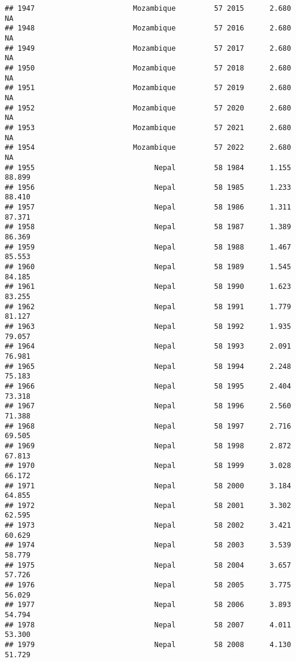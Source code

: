 \documentclass[
]{article}
\begin{document}
\begin{verbatim}
## 1947                       Mozambique         57 2015      2.680         NA
## 1948                       Mozambique         57 2016      2.680         NA
## 1949                       Mozambique         57 2017      2.680         NA
## 1950                       Mozambique         57 2018      2.680         NA
## 1951                       Mozambique         57 2019      2.680         NA
## 1952                       Mozambique         57 2020      2.680         NA
## 1953                       Mozambique         57 2021      2.680         NA
## 1954                       Mozambique         57 2022      2.680         NA
## 1955                            Nepal         58 1984      1.155     88.899
## 1956                            Nepal         58 1985      1.233     88.410
## 1957                            Nepal         58 1986      1.311     87.371
## 1958                            Nepal         58 1987      1.389     86.369
## 1959                            Nepal         58 1988      1.467     85.553
## 1960                            Nepal         58 1989      1.545     84.185
## 1961                            Nepal         58 1990      1.623     83.255
## 1962                            Nepal         58 1991      1.779     81.127
## 1963                            Nepal         58 1992      1.935     79.057
## 1964                            Nepal         58 1993      2.091     76.981
## 1965                            Nepal         58 1994      2.248     75.183
## 1966                            Nepal         58 1995      2.404     73.318
## 1967                            Nepal         58 1996      2.560     71.388
## 1968                            Nepal         58 1997      2.716     69.505
## 1969                            Nepal         58 1998      2.872     67.813
## 1970                            Nepal         58 1999      3.028     66.172
## 1971                            Nepal         58 2000      3.184     64.855
## 1972                            Nepal         58 2001      3.302     62.595
## 1973                            Nepal         58 2002      3.421     60.629
## 1974                            Nepal         58 2003      3.539     58.779
## 1975                            Nepal         58 2004      3.657     57.726
## 1976                            Nepal         58 2005      3.775     56.029
## 1977                            Nepal         58 2006      3.893     54.794
## 1978                            Nepal         58 2007      4.011     53.300
## 1979                            Nepal         58 2008      4.130     51.729

\end{verbatim}
\end{document}
